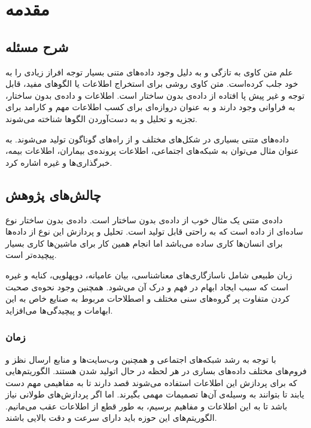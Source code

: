 \documentclass[12pt, a4paper, oneside]{report}
\begin{document}
\chapter{مقدمه}
\pagebreak
\section{شرح مسئله}

علم متن کاوی به تازگی و به دلیل وجود داده‌های متنی بسیار توجه افراز زیادی را به خود جلب کرده‌است.
متن کاوی روشی برای استخراج اطلاعات یا الگوهای مفید، قابل توجه و غیر پیش‌ پا افتاده از داده‌ی
بدون ساختار است. اطلاعات و داده‌ی بدون ساختار، به فراوانی وجود دارند و به عنوان دروازه‌ای برای کسب
اطلاعات مهم و کارامد برای تجزیه و تحلیل و به دست‌آوردن الگوها شناخته می‌شوند\cite{8844895}.

داده‌های متنی بسیاری در شکل‌های مختلف و از راه‌های گوناگون تولید می‌شوند. به عنوان مثال می‌توان به شبکه‌های اجتماعی،
اطلاعات پرونده‌ی بیماران، اطلاعات بیمه، خبرگذاری‌ها و غیره اشاره کرد\cite{DBLP:journals/corr/AllahyariPASTGK17a}.

\section{چالش‌های پژوهش}

داده‌ی متنی یک مثال خوب از داده‌ی بدون ساختار است. داده‌ی بدون ساختار نوع ساده‌ای از داده است که به راحتی قابل تولید است.
تحلیل و پردازش این نوع از داده‌ها برای انسان‌ها کاری ساده می‌باشد اما انجام همین کار برای ماشین‌ها کاری بسیار پیچیده‌تر
است. 

زبان طبیعی شامل ناسازگاری‌های معناشناسی، بیان عامیانه، دوپهلویی، کنایه و غیره است که سبب ایجاد ابهام
در فهم و درک آن می‌شود. همچنین وجود نحوه‌ی صحبت کردن متفاوت پر گروه‌های سنی مختلف و اصطلاحات
مربوط به صنایع خاص به این ابهامات و پیچیدگی‌ها می‌افزاید\cite{8844895}.

\subsection{زمان}

با توجه به رشد شبکه‌های اجتماعی و همچنین وب‌سایت‌ها و منابع ارسال نظز و فروم‌های مختلف
داده‌های بساری در هر لحظه در حال اتولید شدن هستند. الگوریتم‌هایی که برای پردازش این اطلاعات استفاده می‌شوند
قصد دارند تا به مفاهیمی مهم دست یابند تا بتوانند به وسیله‌ی آن‌ها تصمیمات مهمی بگیرند. اما اگر پردازش‌های
طولانی نیاز باشد تا به این اطلاعات و مفاهیم برسیم، به طور قطع از اطلاعات عقب می‌مانیم. الگوریتم‌های
این حوزه باید دارای سرعت و دقت بالایی باشند.
\end{document}
